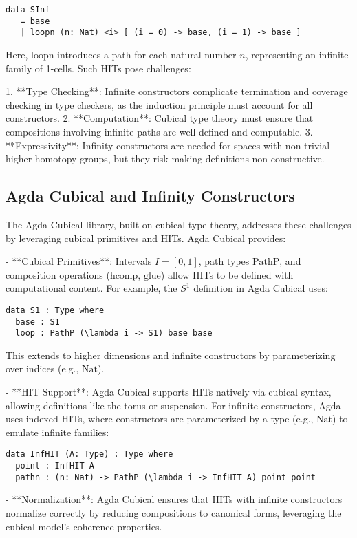 \documentclass{article}
\theoremstyle{definition}
\begin{document}
\begin{lstlisting}
data SInf
   = base
   | loopn (n: Nat) <i> [ (i = 0) -> base, (i = 1) -> base ]
\end{lstlisting}

Here, \( \text{loopn} \) introduces a path for each natural number \( n \), representing an infinite family of 1-cells. Such HITs pose challenges:

1. **Type Checking**: Infinite constructors complicate termination and coverage checking in type checkers, as the induction principle must account for all constructors.
2. **Computation**: Cubical type theory must ensure that compositions involving infinite paths are well-defined and computable.
3. **Expressivity**: Infinity constructors are needed for spaces with non-trivial higher homotopy groups, but they risk making definitions non-constructive.

\subsection{Agda Cubical and Infinity Constructors}
The Agda Cubical library, built on cubical type theory, addresses these challenges by leveraging cubical primitives and HITs. Agda Cubical provides:

- **Cubical Primitives**: Intervals \( I = [0,1] \), path types \( \text{PathP} \), and composition operations (\( \text{hcomp} \), \( \text{glue} \)) allow HITs to be defined with computational content. For example, the \( S^1 \) definition in Agda Cubical uses:
  \begin{lstlisting}
data S1 : Type where
  base : S1
  loop : PathP (\lambda i -> S1) base base
  \end{lstlisting}
  This extends to higher dimensions and infinite constructors by parameterizing over indices (e.g., \( \text{Nat} \)).

- **HIT Support**: Agda Cubical supports HITs natively via cubical syntax, allowing definitions like the torus or suspension. For infinite constructors, Agda uses indexed HITs, where constructors are parameterized by a type (e.g., \( \text{Nat} \)) to emulate infinite families:
  \begin{lstlisting}
data InfHIT (A: Type) : Type where
  point : InfHIT A
  pathn : (n: Nat) -> PathP (\lambda i -> InfHIT A) point point
  \end{lstlisting}

- **Normalization**: Agda Cubical ensures that HITs with infinite constructors normalize correctly by reducing compositions to canonical forms, leveraging the cubical model’s coherence properties.
\end{document}
